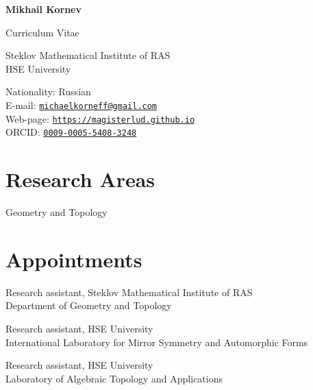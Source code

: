 \documentclass[11pt,letterpaper]{report}
\newcommand{\myname}{Mikhail Kornev}
\newcommand{\namefont}[1]{{\normalfont\bfseries\Huge{#1}}}
\begin{document}
    \raggedright{}

    \namefont{\myname}\par
    \vspace{1em}
    {\Large Curriculum Vitae}\par

    \vspace{1em}
    \begin{minipage}[t]{2.5in}
        Steklov Mathematical Institute of RAS\\
        HSE University
    \end{minipage}
    \hfill
    \begin{minipage}[t]{3in}
        Nationality: Russian\\
        E-mail: \href{mailto:michaelkorneff@gmail.com}{\tt michaelkorneff@gmail.com}\\
        Web-page: \href{https://magisterlud.github.io}{\tt https://magisterlud.github.io}\\
        ORCID: \href{https://orcid.org/0009-0005-5408-3248}{\tt 0009-0005-5408-3248}

    \end{minipage}
    
    \section*{Research Areas}

  Geometry and Topology    
    
    
    
     \section*{Appointments}

    \begin{tablist}

        \item[Sep. 2022 -- present]   \tab{}Research assistant, Steklov Mathematical Institute of RAS  \\
                              Department of Geometry and Topology
                              
        \item[Mar. 2026 -- present] \tab{}Research assistant, HSE University\\
                              International Laboratory for Mirror Symmetry and Automorphic Forms

        \item[Sep. 2021 -- 2025]  \tab{}Research assistant, HSE University \\
                              Laboratory of Algebraic Topology and Applications

    \end{tablist}
\end{document}
